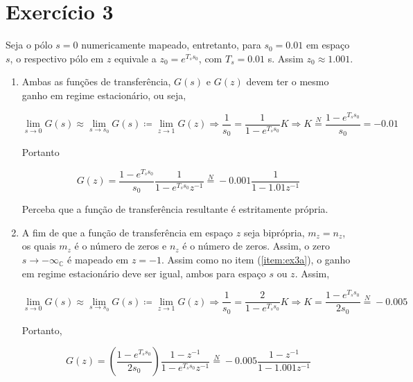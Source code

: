 \documentclass[twoside, fleqn]{article}
\begin{document}
    \section*{Exercício 3}
    
    Seja o pólo $s=0$ numericamente mapeado, entretanto, para $s_0 = 0.01$ em espaço $s$, o respectivo pólo em $z$ equivale a $z_0 = e^{T_s s_0}$, com $T_s = 0.01$ s. Assim $z_0 \approx 1.001$.
    
        \begin{enumerate}
        
        \item %
        \label{item:ex3a}
        
        Ambas as funções de transferência, $G(s)$ e $G(z)$ devem ter o mesmo ganho em regime estacionário, ou seja,
        
            \begin{equation}
                \lim\limits_{s \rightarrow 0} G(s) \approx  \lim\limits_{s \rightarrow s_0} G(s) \coloneqq \lim\limits_{z \rightarrow 1} G(z) \Rightarrow \frac{1}{s_0} = \frac{1}{1 - e^{T_s s_0}} K \Rightarrow K \stackrel{N}{=} \frac{1 - e^{T_s s_0}}{s_0} = - 0.01
            \end{equation}
        
        Portanto
        
            \begin{equation}
                G(z) = \frac{1 - e^{T_s s_0}}{s_0} \frac{1}{1 - e^{T_s s_0} z^{-1}} \stackrel{N}{=} -0.001 \frac{1}{1 - 1.01 z^{-1}}
            \end{equation}
        
        Perceba que a função de transferência resultante é estritamente própria.
        
        \item %
        
        A fim de que a função de transferência em espaço $z$ seja biprópria, $m_z = n_z$, os quais $m_z$ é o número de zeros e $n_z$ é o número de zeros. Assim, o zero $s \rightarrow - \infty_{\mathbb{C}}$ é mapeado em $z = -1$. Assim como no item (\ref{item:ex3a}), o ganho em regime estacionário deve ser igual, ambos para espaço $s$ ou $z$. Assim,
        
            \begin{equation}
                \lim\limits_{s \rightarrow 0} G(s) \approx  \lim\limits_{s \rightarrow s_0} G(s) \coloneqq \lim\limits_{z \rightarrow 1} G(z) \Rightarrow  \frac{1}{s_0} = \frac{2}{1 - e^{T_s s_0}} K \Rightarrow K = \frac{1 - e^{T_s s_0}}{2 s_0} \stackrel{N}{=} - 0.005
            \end{equation}
        
        Portanto,
        
            \begin{equation}
                G(z) =  \left( \frac{1 - e^{T_s s_0}}{2 s_0}\right) \frac{1-z^{-1}}{1 - e^{T_s s_0}  z^{-1}} \stackrel{N}{=} -0.005 \frac{1-z^{-1}}{1 - 1.001  z^{-1}}
            \end{equation}
    \end{enumerate}
\end{document}
